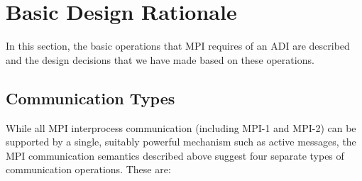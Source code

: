 \documentclass{article}
\begin{document}
\section{Basic Design Rationale}
\label{sec:basic-design}
In this section, the basic operations that MPI requires of an ADI are
described and the design decisions that we have made based on these
operations.

\subsection{Communication Types}

While all MPI interprocess communication (including MPI-1 and MPI-2)
can be supported by a single, suitably powerful mechanism such as
active messages, the MPI communication semantics described above
suggest four separate types of communication operations.  These are:
\end{document}
